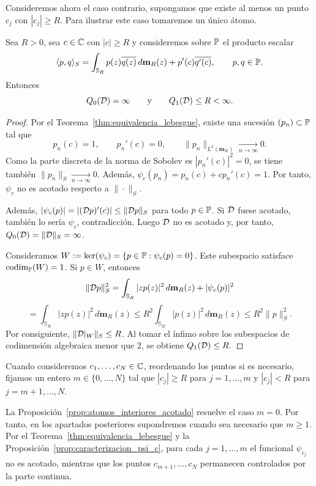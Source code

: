 Consideremos ahora el caso contrario, supongamos que existe al menos un punto $c_j$ con $|c_j|\ge R$. Para ilustrar este caso tomaremos un único átomo.

\begin{thm}\label{thm:un_atomo_exterior}\label{prop:lebesgue_pre_umbral_Qk}
	Sea $R>0$, sea $c\in\mathbb{C}$ con $|c|\ge R$ y consideremos sobre $\mathbb{P}$ el producto escalar
	\[
		\langle p,q\rangle_S
		=
		\int_{\mathbb{S}_R} p(z)\overline{q(z)}\,d\mathbf{m}_R(z)
		+
		p'(c)\overline{q'(c)},
		\qquad p,q\in\mathbb{P}.
	\]
	Entonces
	\[
		Q_0(\mathcal{D})=\infty
		\qquad \text{y} \qquad
		Q_1(\mathcal{D})\le R<\infty.
	\]
\end{thm}

\begin{proof}
	Por el Teorema~\ref{thm:equivalencia_lebesgue}, existe una sucesión $(p_n)\subset\mathbb{P}$ tal que
	\[
		p_n(c)=1,
		\qquad
		p_n'(c)=0,
		\qquad
		\|p_n\|_{L^2(\mathbf{m}_R)}\xrightarrow[n\to\infty]{}0.
	\]
	Como la parte discreta de la norma de Sobolev es $|p_n'(c)|^2=0$, se tiene también \(\|p_n\|_S\xrightarrow[n\to\infty]{}0\). Además, \(\psi_c(p_n)=p_n(c)+cp_n'(c)=1\).
	Por tanto, $\psi_c$ no es acotado respecto a $\|\cdot\|_S$.

	Además, \(|\psi_c(p)|=|(\mathcal{D} p)'(c)|\le \|\mathcal{D} p\|_S\) para todo \(p\in\mathbb{P}\).
	Si $\mathcal{D}$ fuese acotado, también lo sería $\psi_c$, contradicción. Luego $\mathcal{D}$ no es acotado y, por tanto,
	\(Q_0(\mathcal{D})=\|\mathcal{D}\|_S=\infty\).

	Consideramos \(W:=\ker(\psi_c)=\{p\in\mathbb{P}:\psi_c(p)=0\}\).
	Este subespacio satisface $\operatorname{codim}_{\mathbb{P}}(W)=1$. Si $p\in W$, entonces
	\[
		\|\mathcal{D} p\|_S^2
		=
		\int_{\mathbb{S}_R}|zp(z)|^2\,d\mathbf{m}_R(z)
		+
		|\psi_c(p)|^2
	\]\[=
		\int_{\mathbb{S}_R}|zp(z)|^2\,d\mathbf{m}_R(z)
		\le
		R^2\int_{\mathbb{S}_R}|p(z)|^2\,d\mathbf{m}_R(z)
		\le
		R^2\|p\|_S^2.
	\]
	Por consiguiente, $\|\mathcal{D}|_W\|_S\le R$. Al tomar el ínfimo sobre los subespacios de codimensión algebraica menor que $2$, se obtiene
	\(
	Q_1(\mathcal{D})\le R.
	\)
\end{proof}

Cuando consideremos $c_1,\dots,c_N\in\mathbb{C}$, reordenando los puntos si es necesario, fijamos un entero $m\in\{0,\dots,N\}$ tal que $|c_j|\ge R$ para $j=1,\dots,m$ y $|c_j|<R$ para $j=m+1,\dots,N$.

\begin{rmk}
	La Proposición~\ref{prop:atomos_interiores_acotado} resuelve el caso $m=0$. Por tanto, en los apartados posteriores supondremos cuando sea necesario que $m\ge1$.
	Por el Teorema~\ref{thm:equivalencia_lebesgue} y la Proposición~\ref{prop:caracterizacion_psi_c}, para cada $j=1,\dots,m$ el funcional $\psi_{c_j}$ no es acotado, mientras que los puntos $c_{m+1},\dots,c_N$ permanecen controlados por la parte continua.
\end{rmk}

